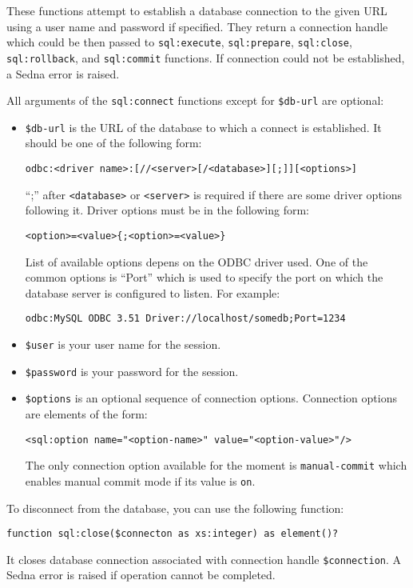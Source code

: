 \documentclass[a4paper,12pt]{article}
\begin{document}
These functions attempt to establish a database connection to the given URL
using a user name and password if specified. They return a connection handle
which could be then passed to \verb!sql:execute!, \verb!sql:prepare!,
\verb!sql:close!, \verb!sql:rollback!, and \verb!sql:commit! functions. If
connection could not be established, a Sedna error is raised.

All arguments of the \verb!sql:connect! functions except for \verb!$db-url! are
optional:

\begin{itemize}
\item\verb!$db-url! is the URL of the database to which a connect is
established. It should be one of the following form:
\small{\begin{verbatim}
odbc:<driver name>:[//<server>[/<database>][;]][<options>]
\end{verbatim}}
``;'' after \verb!<database>! or \verb!<server>! is required if there are some
driver options following it. Driver options must be in the following form:
\begin{verbatim}
<option>=<value>{;<option>=<value>}
\end{verbatim}
List of available options depens on the ODBC driver used. One of the common
options is ``Port'' which is used to specify the port on which the database
server is configured to listen. For example:
\small{\begin{verbatim}
odbc:MySQL ODBC 3.51 Driver://localhost/somedb;Port=1234
\end{verbatim}}
\item\verb!$user! is your user name for the session.
\item\verb!$password! is your password for the session.
\item\verb!$options! is an optional sequence of connection options. Connection
options are elements of the form:
\begin{verbatim}
<sql:option name="<option-name>" value="<option-value>"/>
\end{verbatim}
The only connection option available for the moment is \verb!manual-commit!
which enables manual commit mode if its value is \verb!on!.
\end{itemize}

To disconnect from the database, you can use the following function:
\begin{verbatim}
function sql:close($connecton as xs:integer) as element()?
\end{verbatim}
It closes database connection associated with connection handle
\verb!$connection!. A Sedna error is raised if operation cannot be completed.
\end{document}
